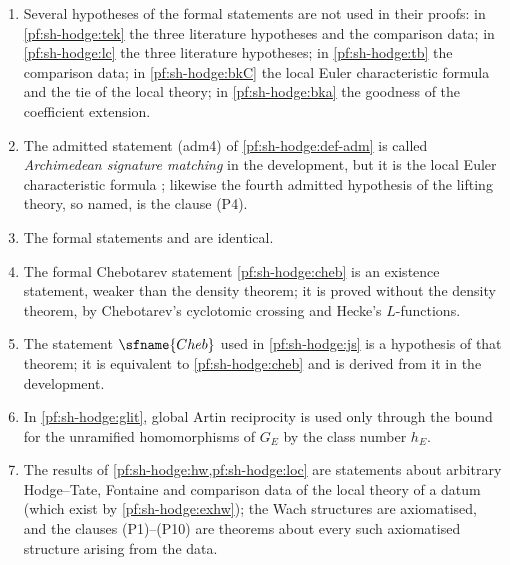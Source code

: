 \begin{enumerate}
\item Several hypotheses of the formal statements are not used in their proofs: in \cref{pf:sh-hodge:tek} the three literature hypotheses and the
  comparison data; in \cref{pf:sh-hodge:lc} the three literature hypotheses; in \cref{pf:sh-hodge:tb} the comparison data; in \cref{pf:sh-hodge:bkC}
  the local Euler characteristic formula and the tie of the local theory; in \cref{pf:sh-hodge:bka} the goodness of the coefficient extension.
\item The admitted statement (adm4) of \cref{pf:sh-hodge:def-adm} is called \emph{Archimedean signature matching} in the development, but it is the local
  Euler characteristic formula \shhodgeLEC; likewise the fourth admitted hypothesis of the lifting theory, so named, is the clause (P4).
\item The formal statements  and
   are identical.
\item The formal Chebotarev statement \cref{pf:sh-hodge:cheb} is an existence statement, weaker than the density theorem; it is proved without the
  density theorem, by Chebotarev's cyclotomic crossing and Hecke's $L$-functions.
\item The statement $\sfname{Cheb}$ used in \cref{pf:sh-hodge:js} is a hypothesis of that theorem; it is equivalent to \cref{pf:sh-hodge:cheb} and
  is derived from it in the development.
\item In \cref{pf:sh-hodge:glit}, global Artin reciprocity \shhodgeGAR{} is used only through the bound for the unramified homomorphisms of $G_E$
  by the class number $h_E$.
\item The results of \cref{pf:sh-hodge:hw,pf:sh-hodge:loc} are statements about arbitrary Hodge--Tate, Fontaine and comparison data of the local theory of a
  datum (which exist by \cref{pf:sh-hodge:exhw}); the Wach structures are axiomatised, and the clauses (P1)--(P10) are theorems about every such
  axiomatised structure arising from the data.
\end{enumerate}
